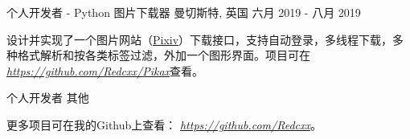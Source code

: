 \begin{cventries}
  \cventry
    {个人开发者 - Python} %
    {图片下载器} %
    {曼切斯特, 英国} %
    {六月 2019 - 八月 2019} %
    {
      \begin{cvitems} %
        \item {设计并实现了一个图片网站（\href{https://www.pixiv.net/}{Pixiv}）下载接口，支持自动登录，多线程下载，多种格式解析和按各类标签过滤，外加一个图形界面。项目可在 \href{https://github.com/Redcxx/Pikax}{\textit{https://github.com/Redcxx/Pikax}}查看。}
      \end{cvitems}
    }
    
  \cventry
    {个人开发者} %
    {其他} %
    {} %
    {} %
    {
      \begin{cvitems} %
        \item {更多项目可在我的Github上查看： \href{https://github.com/Redcxx}{\textit{https://github.com/Redcxx}}。}
      \end{cvitems}
    }
  
    


\end{cventries}
